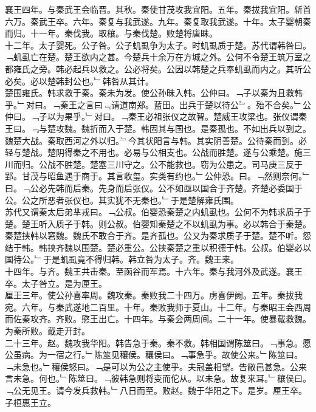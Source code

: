 \documentclass{zhvt-classic}
\begin{document}
\hspace*{2em}襄王四年。与秦武王会临晋。其秋。秦使甘茂攻我宜阳。五年。秦拔我宜阳。斩首六万。秦武王卒。六年。秦复与我武遂。九年。秦复取我武遂。十年。太子婴朝秦而归。十一年。秦伐我。取穰。与秦伐楚。败楚将唐眛。\\
\hspace*{2em}十二年。太子婴死。公子咎。公子虮虱争为太子。时虮虱质于楚。苏代谓韩咎曰。﹁虮虱亡在楚。楚王欲内之甚。今楚兵十余万在方城之外。公何不令楚王筑万室之都雍氏之旁。韩必起兵以救之。公必将矣。公因以韩楚之兵奉虮虱而内之。其听公必矣。必以楚韩封公也。﹂韩咎从其计。\\
\hspace*{2em}楚围雍氏。韩求救于秦。秦未为发。使公孙昧入韩。公仲曰。﹁子以秦为且救韩乎。﹂对曰。﹁秦王之言曰﹃请道南郑。蓝田。出兵于楚以待公﹄。殆不合矣。﹂公仲曰。﹁子以为果乎。﹂对曰。﹁秦王必祖张仪之故智。楚威王攻梁也。张仪谓秦王曰。﹃与楚攻魏。魏折而入于楚。韩固其与国也。是秦孤也。不如出兵以到之。魏楚大战。秦取西河之外以归。﹄今其状阳言与韩。其实阴善楚。公待秦而到。必轻与楚战。楚阴得秦之不用也。必易与公相支也。公战而胜楚。遂与公乘楚。施三川而归。公战不胜楚。楚塞三川守之。公不能救也。窃为公患之。司马庚三反于郢。甘茂与昭鱼遇于商于。其言收玺。实类有约也。﹂公仲恐。曰。﹁然则奈何。﹂曰。﹁公必先韩而后秦。先身而后张仪。公不如亟以国合于齐楚。齐楚必委国于公。公之所恶者张仪也。其实犹不无秦也。﹂于是楚解雍氏围。\\
\hspace*{2em}苏代又谓秦太后弟芈戎曰。﹁公叔。伯婴恐秦楚之内虮虱也。公何不为韩求质子于楚。楚王听入质子于韩。则公叔。伯婴知秦楚之不以虮虱为事。必以韩合于秦楚。秦楚挟韩以窘魏。魏氏不敢合于齐。是齐孤也。公又为秦求质子于楚。楚不听。怨结于韩。韩挟齐魏以围楚。楚必重公。公挟秦楚之重以积德于韩。公叔。伯婴必以国待公。﹂于是虮虱竟不得归韩。韩立咎为太子。齐。魏王来。\\
\hspace*{2em}十四年。与齐。魏王共击秦。至函谷而军焉。十六年。秦与我河外及武遂。襄王卒。太子咎立。是为厘王。\\
\hspace*{2em}厘王三年。使公孙喜率周。魏攻秦。秦败我二十四万。虏喜伊阙。五年。秦拔我宛。六年。与秦武遂地二百里。十年。秦败我师于夏山。十二年。与秦昭王会西周而佐秦攻齐。齐败。愍王出亡。十四年。与秦会两周间。二十一年。使暴䳒救魏。为秦所败。䳒走开封。\\
\hspace*{2em}二十三年。赵。魏攻我华阳。韩告急于秦。秦不救。韩相国谓陈筮曰。﹁事急。愿公虽病。为一宿之行。﹂陈筮见穰侯。穰侯曰。﹁事急乎。故使公来。﹂陈筮曰。﹁未急也。﹂穰侯怒曰。﹁是可以为公之主使乎。夫冠盖相望。告敝邑甚急。公来言未急。何也。﹂陈筮曰。﹁彼韩急则将变而佗从。以未急。故复来耳。﹂穰侯曰。﹁公无见王。请今发兵救韩。﹂八日而至。败赵。魏于华阳之下。是岁。厘王卒。子桓惠王立。\\
\end{document}
